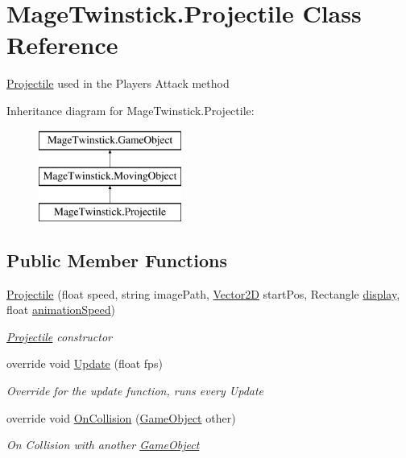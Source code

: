 \hypertarget{class_mage_twinstick_1_1_projectile}{}\section{Mage\+Twinstick.\+Projectile Class Reference}
\label{class_mage_twinstick_1_1_projectile}


\hyperlink{class_mage_twinstick_1_1_projectile}{Projectile} used in the Players Attack method  


Inheritance diagram for Mage\+Twinstick.\+Projectile\+:\begin{figure}[H]
\begin{center}
\leavevmode
\includegraphics[height=3.000000cm]{class_mage_twinstick_1_1_projectile}
\end{center}
\end{figure}
\subsection*{Public Member Functions}
\begin{DoxyCompactItemize}
\item 
\hyperlink{class_mage_twinstick_1_1_projectile_a2e18fb2d662c973c867069a248b5a5ed}{Projectile} (float speed, string image\+Path, \hyperlink{class_mage_twinstick_1_1_vector2_d}{Vector2\+D} start\+Pos, Rectangle \hyperlink{class_mage_twinstick_1_1_game_object_a5807df7f837dc87c8955a008d0b27b50}{display}, float \hyperlink{class_mage_twinstick_1_1_game_object_a5d21c31402c27c5a19f2a62d98720456}{animation\+Speed})
\begin{DoxyCompactList}\small\item\em \hyperlink{class_mage_twinstick_1_1_projectile}{Projectile} constructor \end{DoxyCompactList}\item 
override void \hyperlink{class_mage_twinstick_1_1_projectile_a9208eff25bc92289191d5470bbc7015a}{Update} (float fps)
\begin{DoxyCompactList}\small\item\em Override for the update function, runs every Update \end{DoxyCompactList}\item 
override void \hyperlink{class_mage_twinstick_1_1_projectile_ad646d013997eceb12a0ac2f5df56d3bb}{On\+Collision} (\hyperlink{class_mage_twinstick_1_1_game_object}{Game\+Object} other)
\begin{DoxyCompactList}\small\item\em On Collision with another \hyperlink{class_mage_twinstick_1_1_game_object}{Game\+Object} \end{DoxyCompactList}\end{DoxyCompactItemize}
